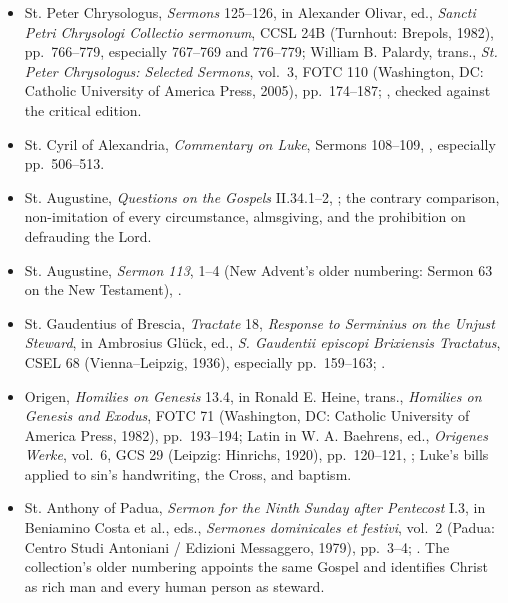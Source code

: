 {\begin{itemize}[itemsep=0em,topsep=0.15em,parsep=0pt]
\item St. Peter Chrysologus, \emph{Sermons} 125--126, in Alexander Olivar, ed., \emph{Sancti Petri Chrysologi Collectio sermonum}, CCSL 24B (Turnhout: Brepols, 1982), pp.~766--779, especially 767--769 and 776--779; William B. Palardy, trans., \emph{St. Peter Chrysologus: Selected Sermons}, vol.~3, FOTC 110 (Washington, DC: Catholic University of America Press, 2005), pp.~174--187; , checked against the critical edition.
\item St. Cyril of Alexandria, \emph{Commentary on Luke}, Sermons 108--109, , especially pp.~506--513.
\item St. Augustine, \emph{Questions on the Gospels} II.34.1--2, ; the contrary comparison, non-imitation of every circumstance, almsgiving, and the prohibition on defrauding the Lord.
\item St. Augustine, \emph{Sermon 113}, 1--4 (New Advent's older numbering: Sermon 63 on the New Testament), .
\item St. Gaudentius of Brescia, \emph{Tractate} 18, \emph{Response to Serminius on the Unjust Steward}, in Ambrosius Gl\"uck, ed., \emph{S. Gaudentii episcopi Brixiensis Tractatus}, CSEL 68 (Vienna--Leipzig, 1936), especially pp.~159--163; .
\item Origen, \emph{Homilies on Genesis} 13.4, in Ronald E. Heine, trans., \emph{Homilies on Genesis and Exodus}, FOTC 71 (Washington, DC: Catholic University of America Press, 1982), pp.~193--194; Latin in W. A. Baehrens, ed., \emph{Origenes Werke}, vol.~6, GCS 29 (Leipzig: Hinrichs, 1920), pp.~120--121, ; Luke's bills applied to sin's handwriting, the Cross, and baptism.
\item St. Anthony of Padua, \emph{Sermon for the Ninth Sunday after Pentecost} I.3, in Beniamino Costa et al., eds., \emph{Sermones dominicales et festivi}, vol.~2 (Padua: Centro Studi Antoniani / Edizioni Messaggero, 1979), pp.~3--4; . The collection's older numbering appoints the same Gospel and identifies Christ as rich man and every human person as steward.

\end{itemize}}
